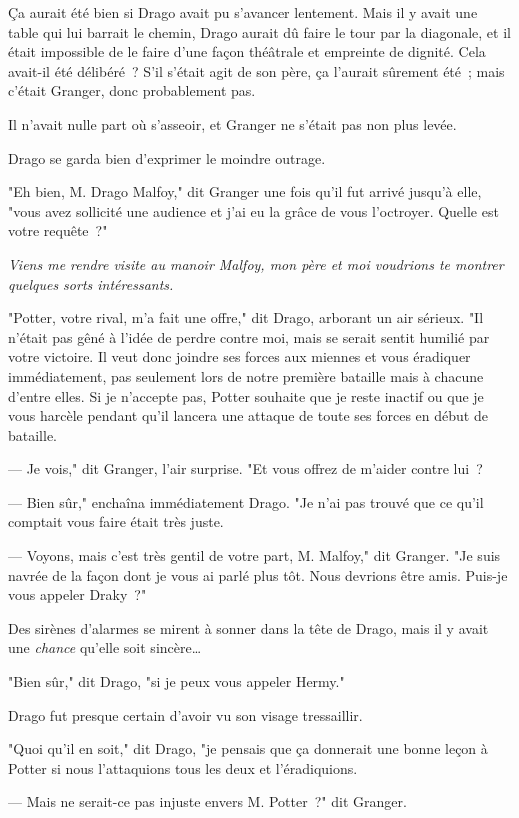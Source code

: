 Ça aurait été bien si Drago avait pu s'avancer lentement. Mais il y avait une table qui lui barrait le chemin, Drago aurait dû faire le tour par la diagonale, et il était impossible de le faire d'une façon théâtrale et empreinte de dignité. Cela avait-il été délibéré~? S'il s'était agit de son père, ça l'aurait sûrement été~; mais c'était Granger, donc probablement pas.

Il n'avait nulle part où s'asseoir, et Granger ne s'était pas non plus levée.

Drago se garda bien d'exprimer le moindre outrage.

"Eh bien, M. Drago Malfoy," dit Granger une fois qu'il fut arrivé jusqu'à elle, "vous avez sollicité une audience et j'ai eu la grâce de vous l'octroyer. Quelle est votre requête~?"

\emph{Viens me rendre visite au manoir Malfoy, mon père et moi voudrions te montrer quelques sorts intéressants.}

"Potter, votre rival, m'a fait une offre," dit Drago, arborant un air sérieux. "Il n'était pas gêné à l'idée de perdre contre moi, mais se serait sentit humilié par votre victoire. Il veut donc joindre ses forces aux miennes et vous éradiquer immédiatement, pas seulement lors de notre première bataille mais à chacune d'entre elles. Si je n'accepte pas, Potter souhaite que je reste inactif ou que je vous harcèle pendant qu'il lancera une attaque de toute ses forces en début de bataille.

--- Je vois," dit Granger, l'air surprise. "Et vous offrez de m'aider contre lui~?

--- Bien sûr," enchaîna immédiatement Drago. "Je n'ai pas trouvé que ce qu'il comptait vous faire était très juste.

--- Voyons, mais c'est très gentil de votre part, M. Malfoy," dit Granger. "Je suis navrée de la façon dont je vous ai parlé plus tôt. Nous devrions être amis. Puis-je vous appeler Draky~?"

Des sirènes d'alarmes se mirent à sonner dans la tête de Drago, mais il y avait une \emph{chance} qu'elle soit sincère…

"Bien sûr," dit Drago, "si je peux vous appeler Hermy."

Drago fut presque certain d'avoir vu son visage tressaillir.

"Quoi qu'il en soit," dit Drago, "je pensais que ça donnerait une bonne leçon à Potter si nous l'attaquions tous les deux et l'éradiquions.

--- Mais ne serait-ce pas injuste envers M. Potter~?" dit Granger.

